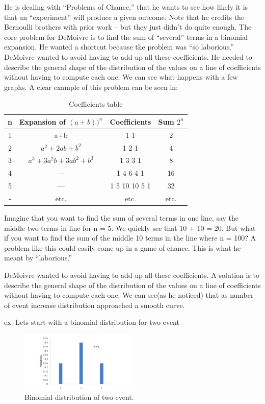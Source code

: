 \documentclass{article}
\begin{document}
He is dealing with “Problems of Chance,” that he wants
to see how likely it is that an
“experiment” will produce a given
outcome. Note that he credits the
Bernoulli brothers with prior work –
but they just didn’t do quite enough.
The core problem for DeMoivre is to
find the sum of “several” terms in a
binomial expansion. He wanted a
shortcut because the problem was “so
laborious.”
DeMoivre wanted to avoid having to add up all these coefficients. He needed to describe the general
shape of the distribution of the values on a line of coefficients without having to compute each one. We can see what happens with a few graphs.
A clear example of this problem can be seen in:
\begin{table}[H]
\centering
\begin{tabular}{c|c|c|c}
    n &  Expansion of $ (a+b))^n $ & Coefficients & Sum $ 2^{n} $ \\\hline

    1 &  a+b& 1 1 & 2                                \\
    2 & $ a^2 +2ab+b^2 $ & 1 2 1 & 4                     \\
    3 & $ a^3+3a^{2}b+3ab^2+b^3 $ & 1 3 3 1 & 8                \\
    4 & ---   & 1 4 6 4 1 & 16                         \\
    5 & ---   & 1 5 10 10 5 1 & 32                     \\
    - & etc. & etc. & etc.                         \\

\end{tabular}
\caption{\label{tab:widgets}Coefficients table}
\end{table}

Imagine that you want to find the sum of
several terms in one line, say the middle two
terms in line for n = 5.
We quickly see that 10 + 10 = 20.
But what if you want to find the sum of the middle
10 terms in the line where n = 100? A problem like
this could easily come up in a game of chance. This
is what he meant by “laborious.”

DeMoivre wanted to avoid having to add up all these coefficients. A solution is to describe the general shape of the distribution of the values on a line of coefficients without having to compute each one. We
can see(as he noticed) that as number of event increase distribution approached a smooth curve.

ex. Lets start with a binomial distribution for two event
\begin{figure}[H]
\centering
\includegraphics[width=0.5\textwidth]{images/0.png}
\caption{\label{fig:bin2}Binomial distribution of two event.}
\end{figure}
\end{document}
